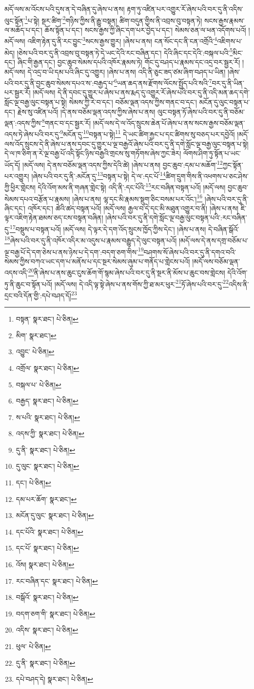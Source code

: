མདོ་ལས་མ་འོངས་པའི་དུས་ན་དེ་བཞིན་དུ་ཞེས་པ་ནས། རྟག་ཏུ་འཛིན་པར་འགྱུར་རོ་ཞེས་པའི་བར་དུ་ནི་འདིས་ལུང་སྟོན་\footnote{བསྟན་  སྣར་ཐང་།  པེ་ཅིན། }པ་སྟེ། སྔར་ཚིག་\footnote{མིག་  སྣར་ཐང་། }གཉིས་ཀྱིས་ནི་རྒྱུ་བསྟན། ཚིག་བདུན་གྱིས་ནི་འབྲས་བུ་བསྟན་ཏེ། སངས་རྒྱས་རྣམས་ལ་མཆོད་པ་དང་། ཆོས་སྟོན་པ་དང་། སངས་རྒྱས་ཀྱི་ཞིང་དག་པར་བྱེད་པ་དང་། སེམས་ཅན་ལ་ཕན་འདོགས་པའོ། །མདོ་ལས། འཇིག་རྟེན་དུ་ནི་རང་བྱུང་\footnote{འབྱུང་  པེ་ཅིན། }སངས་རྒྱས་གྱུར། །ཞེས་པ་ནས། ངན་སོང་དང་ནི་ངན་འགྲོའི་\footnote{འགྲོལ་  སྣར་ཐང་།  པེ་ཅིན། }འཇིགས་པ་མེད། །ཅེས་པའི་བར་དུ་ནི་འབྲས་བུ་བསྟན་ཏེ་དེ་ཡང་དེའི་རང་བཞིན་དང་། དེའི་ཞིང་དང་དེའི་:བསྐལ་པའི་\footnote{བསྐལ་པ་  པེ་ཅིན། }མིང་དང་། ཞིང་གི་རྒྱན་དང་། བྱང་ཆུབ་སེམས་དཔའི་འཁོར་རྣམས་ཏེ། གོང་དུ་བཤད་པ་རྣམས་དང་འདྲ་བར་སྦྱར་རོ། །མདོ་ལས། དེ་འདྲ་བ་ཡི་དམ་པའི་ཞིང་དུ་འགྱུར། །ཞེས་པ་ནས། འདི་ནི་ཅུང་ཟད་ཙམ་ཞིག་བཤད་པ་ཡིན། །ཞེས་པའི་བར་དུ་ནི་བྱང་ཆུབ་སེམས་དཔའ་ས་:བརྒྱད་པ་\footnote{བརྒྱད་  སྣར་ཐང་།  པེ་ཅིན། }ཡན་ཆད་ནས་རྫོགས་ལོངས་སྤྱོད་པའི་སའི་\footnote{ས་པའི་  སྣར་ཐང་།  པེ་ཅིན། }བར་དུ་ནི་ཡིན་པར་སྦྱར་རོ། །མདོ་ལས། དེ་ནི་དབང་དུ་གྱུར་པ་ཞེས་པ་ནས་རྨད་དུ་འགྱུར་རོ་ཞེས་པའི་བར་དུ་ནི་འདི་མན་ཆད་དགེ་སློང་ལྔ་བརྒྱ་ལུང་བསྟན་པ་སྟེ། སེམས་ཀྱི་རེ་བ་དང་། བཅོམ་ལྡན་འདས་ཀྱིས་གནང་བ་དང་། མངོན་དུ་ལུང་བསྟན་པ་དང་། རྗེས་སུ་འཛིན་པའོ། །དེ་ནས་བཅོམ་ལྡན་འདས་ཀྱིས་ཞེས་པ་ནས། ལུང་བསྟན་ཏོ་ཞེས་པའི་བར་དུ་ནི་བཅོམ་ལྡན་:འདས་ཀྱིས་\footnote{འདས་ཀྱི་  སྣར་ཐང་།  པེ་ཅིན། }གནང་བ་དང་སྦྱར་རོ། །མདོ་ལས་དེ་ལ་འོད་སྲུངས་ཆེན་པོ་ཞེས་པ་ནས་སངས་རྒྱས་བཅོམ་ལྡན་འདས་ཏེ་ཞེས་པའི་བར་དུ་\footnote{དུ་ནི་  སྣར་ཐང་།  པེ་ཅིན། }མངོན་དུ་\footnote{དུ་ལུང་  སྣར་ཐང་།  པེ་ཅིན། }བསྟན་པ་སྟེ།\footnote{དང་།  པེ་ཅིན། } དེ་ཡང་ཚིག་རྐྱང་པ་དང་ཚིགས་སུ་བཅད་པར་དབྱེའོ། །མདོ་ལས་འོད་སྲུངས་དེ་ནི་ཞེས་པ་ནས་དབང་དུ་གྱུར་པ་ལྔ་བརྒྱའོ་ཞེས་པའི་བར་དུ་ནི་དགེ་སློང་ལྔ་བརྒྱ་ལུང་བསྟན་པ་སྟེ། དེ་ལ་ཁ་ཅིག་ན་རེ་ལྔ་བརྒྱ་པོ་འདི་སྟོང་ཉིས་བརྒྱའི་གྲངས་སུ་གཏོགས་ཞེས་ཀྱང་ཟེར། ལོགས་ཤིག་ཏུ་སྟོན་པ་ཡང་ཡོད་དོ། །མདོ་ལས། དེ་ནས་བཅོམ་ལྡན་འདས་ཀྱིས་དེའི་ཚེ། །ཞེས་པ་ནས། བྱང་ཆུབ་:དམ་པ་མཆོག་\footnote{དམ་པར་ཆོག་  སྣར་ཐང་། }ཀྱང་སྟོན་པར་འགྱུར། །ཞེས་པའི་བར་དུ་ནི་:མངོན་དུ་\footnote{མངོན་དུ་ལུང་  སྣར་ཐང་།  པེ་ཅིན། }བསྟན་པ་སྟེ། དེ་ལ་:དང་པོ་\footnote{དང་པོའི་  སྣར་ཐང་།  པེ་ཅིན། }ཚིག་དྲུག་གིས་ནི་འཕགས་པ་ཅང་ཤེས་ཀྱི་ཕྱིར་གླེངས། དེའི་འོག་མས་ནི་གཞན་གླེང་སྟེ། འདི་ནི་:དང་པོའི་\footnote{དང་པོ་  སྣར་ཐང་།  པེ་ཅིན། }རང་བཞིན་བསྟན་པའོ། །མདོ་ལས། བྱང་ཆུབ་སེམས་དཔའ་བརྩོན་པ་རྣམས། །ཞེས་པ་ནས། ལྷ་དང་མི་རྣམས་སྡུག་ཅིང་བསམ་པར་འོང་།\footnote{འོས།  སྣར་ཐང་།  པེ་ཅིན། } །ཞེས་པའི་བར་དུ་ནི་ཞིང་དང་། འཁོར་དང་། ཚེའི་ཚད་བསྟན་པའོ། །མདོ་ལས། རྒྱལ་བ་དེ་དང་མི་མཐུན་འགྱུར་བ་ནི། །ཞེས་པ་ནས། ཇི་ལྟར་འཇིག་རྟེན་ཐམས་ཅད་ངས་བསྟན་བཞིན། །ཞེས་པའི་བར་དུ་ནི་དགེ་སློང་ལྔ་བརྒྱ་ལུང་བསྟན་པའི་:རང་བཞིན་དུ་\footnote{རང་བཞིན་དང་  སྣར་ཐང་།  པེ་ཅིན། }བསྡུས་པ་བསྟན་པའོ། །མདོ་ལས། དེ་ལྟར་དེ་དག་འོད་སྲུངས་ཁྱོད་ཀྱིས་དེང་། །ཞེས་པ་ནས། དེ་བཞིན་སྒོའོ་\footnote{བསྒོའོ་  སྣར་ཐང་།  པེ་ཅིན། }ཞེས་པའི་བར་དུ་ནི་འཁོར་འདིར་མ་འདུས་པ་རྣམས་བརྒྱུད་དེ་ལུང་བསྟན་པའོ། །མདོ་ལས་དེ་ནས་དགྲ་བཅོམ་པ་ལྔ་བརྒྱ་པོ་དེ་དག་ཅེས་པ་ནས་ཉེས་པ་དེ་དག་:བདག་ཅག་གིས་\footnote{བདག་ཅག་གི་  སྣར་ཐང་།  པེ་ཅིན། }བཤགས་སོ་ཞེས་པའི་བར་དུ་ནི་དགའ་བའི་སེམས་ཀྱིས་བཀའ་ཡང་དག་པ་མནོས་པ་དང་སྔར་སེམས་ཞུམ་པ་གནོད་པ་གླེངས་པའོ། །མདོ་ལས་བཅོམ་ལྡན་འདས་འདི་\footnote{འདིས་  སྣར་ཐང་།  པེ་ཅིན། }ནི་ཞེས་པ་ནས་ཆུང་ངུས་ཆོག་གོ་སྙམ་ཞེས་པའི་བར་དུ་ནི་སྔར་ནི་མོས་པ་ཆུང་བས་གླེངས། དེའི་འོག་ཏུ་ནི་ཆུང་བ་སྟོན་པའོ། །མདོ་ལས། དེ་འདི་ལྟ་སྟེ་ཞེས་པ་ནས་གོས་ཀྱི་ཐ་མར་ཕུར་\footnote{ཕུལ་  པེ་ཅིན། }ཏོ་ཞེས་པའི་བར་དུ་\footnote{དུ་ནི་  སྣར་ཐང་།  པེ་ཅིན། }འདིས་ནི་དྲང་བའི་དོན་གྱི་:དཔེ་བཤད་དོ།\footnote{དཔེ་བཤད་དེ།  སྣར་ཐང་།  པེ་ཅིན། } 